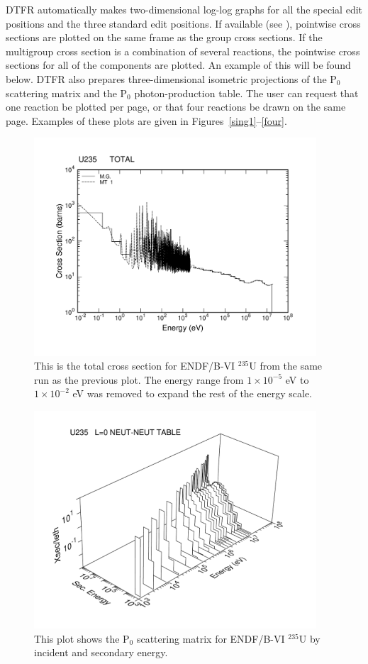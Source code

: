 DTFR automatically makes two-dimensional log-log graphs for all the
special edit positions and the three standard edit positions.  If
available (see ), pointwise cross sections are plotted
on the same frame as the group cross sections.  If the multigroup
cross section is a combination of several reactions, the pointwise
cross sections for all of the components are plotted.  An example
of this will be found below.  DTFR also prepares three-dimensional
isometric projections of the P$_0$ scattering matrix and the P$_0$
photon-production table.  The user can request that one reaction
be plotted per page, or that four reactions be drawn on the same
page.  Examples of these plots are given in
Figures~\ref{sing1}--\ref{four}.

\begin{figure}[hp]\centering
\includegraphics[keepaspectratio, height=3.2in, angle=0]{figs/dtfr2ack}
\caption[DTFR cross section plot example, expanded energy range]{This
 is the total cross section for ENDF/B-VI $^{235}$U from the same run as
 the previous plot.  The energy range from $1{\times}10^{-5}$ eV to
 $1{\times}10^{-2}$ eV was removed to expand the rest of the energy scale.}
\label{sing2}
\end{figure}

\begin{figure}[hp]\centering
\includegraphics[keepaspectratio, height=3.2in, angle=0]{figs/dtfr3ack}
\caption[DTFR scattering matrix plot example]{This plot shows the P$_0$
 scattering matrix for ENDF/B-VI $^{235}$U by incident and secondary energy.}
\label{sing3}
\end{figure}

